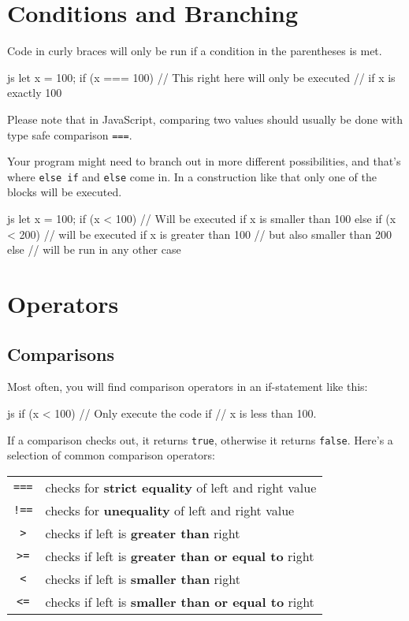 \documentclass[10pt,a4paper]{article}
\begin{document}
\begin{multicols}{3}
\section*{Conditions and Branching}
Code in curly braces will only be run if a condition in the parentheses is met.

\begin{codebox}{js}{}
  let x = 100;
  if (x === 100) {
    // This right here will only be executed
    // if x is exactly 100
  }
\end{codebox}
Please note that in JavaScript, comparing two values should usually be done with type safe comparison \texttt{===}.

Your program might need to branch out in more different possibilities, and that's where \texttt{else if} and \texttt{else} come in. In a construction like that only one of the blocks will be executed.
\begin{codebox}{js}{}
  let x = 100;
  if (x < 100) {
    // Will be executed if x is smaller than 100
  } else if (x < 200) {
    // will be executed if x is greater than 100
    // but also smaller than 200
  } else {
    // will be run in any other case
  }
\end{codebox}


\section*{Operators}
\subsection*{Comparisons}
Most often, you will find comparison operators in an if-statement like this:

\begin{codebox}{js}{}
  if (x < 100) {
    // Only execute the code if
    // x is less than 100.
  }
\end{codebox}
If a comparison checks out, it returns \texttt{true}, otherwise it returns \texttt{false}. Here's a selection of common comparison operators:

\vspace{0.5cm}
\begin{tabular}{c l}
  \texttt{===} & checks for \textbf{strict equality} of left and right value \\
  \texttt{!==} & checks for \textbf{unequality} of left and right value \\
  \texttt{>} & checks if left is \textbf{greater than} right \\
  \texttt{>=} & checks if left is \textbf{greater than or equal to} right \\
  \texttt{<} & checks if left is \textbf{smaller than} right \\
  \texttt{<=} & checks if left is \textbf{smaller than or equal to} right \\
\end{tabular}


\end{multicols}
\end{document}

